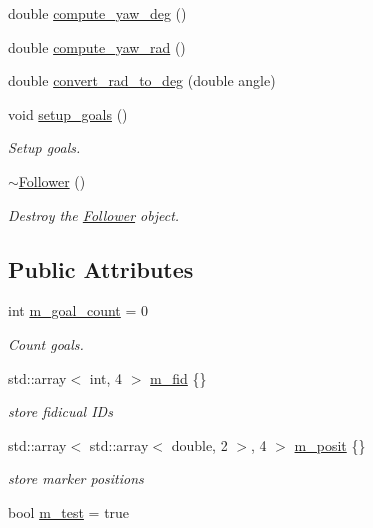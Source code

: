 \begin{DoxyCompactItemize}
double \hyperlink{class_follower_ac988cad87474cb64ef3be7fe197d90a7}{compute\+\_\+yaw\+\_\+deg} ()
\item 
double \hyperlink{class_follower_abde593631e6549062d77fb2169a17c66}{compute\+\_\+yaw\+\_\+rad} ()
\item 
double \hyperlink{class_follower_a670f07466502e1020514d6ba6b928553}{convert\+\_\+rad\+\_\+to\+\_\+deg} (double angle)
\item 
void \hyperlink{class_follower_a9ff755f0d81808c372bfcaac0a45471c}{setup\+\_\+goals} ()
\begin{DoxyCompactList}\small\item\em Setup goals. \end{DoxyCompactList}\item 
\hyperlink{class_follower_a1dd55289af5ded7a57a2874c5477c33d}{$\sim$\+Follower} ()
\begin{DoxyCompactList}\small\item\em Destroy the \hyperlink{class_follower}{Follower} object. \end{DoxyCompactList}\end{DoxyCompactItemize}
\subsection*{Public Attributes}
\begin{DoxyCompactItemize}
\item 
int \hyperlink{class_follower_af53c7dcd8b5a99111bdfe0c8dd2015cf}{m\+\_\+goal\+\_\+count} = 0
\begin{DoxyCompactList}\small\item\em Count goals. \end{DoxyCompactList}\item 
std\+::array$<$ int, 4 $>$ \hyperlink{class_follower_a350054bbd7659d493cccc4b4ad9bc460}{m\+\_\+fid} \{\}
\begin{DoxyCompactList}\small\item\em store fidicual I\+Ds \end{DoxyCompactList}\item 
std\+::array$<$ std\+::array$<$ double, 2 $>$, 4 $>$ \hyperlink{class_follower_a6d4e1ebbe79cc8af601d53cba7aeb30a}{m\+\_\+posit} \{\}
\begin{DoxyCompactList}\small\item\em store marker positions \end{DoxyCompactList}\item 
bool \hyperlink{class_follower_a64e365d54197c51a8d1f777900b09647}{m\+\_\+test} = true
\end{DoxyCompactItemize}


